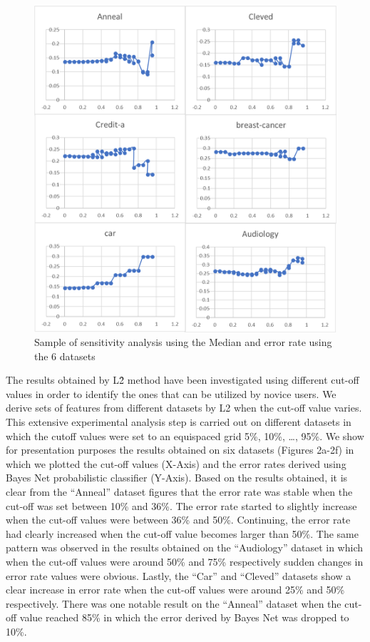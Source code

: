 \documentclass[review]{elsarticle}
\begin{document}
\begin{figure}[h]
	\centering
	\includegraphics[width=1\linewidth]{figs/results}
	\caption[Figs 2a-2f]{Sample of sensitivity analysis using the Median and error rate using the 6 datasets}
	\label{fig:2a2f}
\end{figure}

The results obtained by L\^2 method have been investigated using different cut-off values in order to identify the ones that can be utilized by novice users. We derive sets of features from different datasets by L2 when the cut-off value varies. This extensive experimental analysis step is carried out on different datasets in which the cutoff values were set to an equispaced grid {5\%, 10\%, …, 95\%}. We show for presentation purposes the results obtained on six datasets (Figures 2a-2f) in which we plotted the cut-off values (X-Axis) and the error rates derived using Bayes Net probabilistic classifier (Y-Axis). Based on the results obtained, it is clear from the “Anneal” dataset figures that the error rate was stable when the cut-off was set between 10\% and 36\%. The error rate started to slightly increase when the cut-off values were between 36\% and 50\%. Continuing, the error rate had clearly increased when the cut-off value becomes larger than 50\%. The same pattern was observed in the results obtained on the “Audiology” dataset in which when the cut-off values were around 50\% and 75\% respectively sudden changes in error rate values were obvious. Lastly, the “Car” and “Cleved” datasets show a clear increase in error rate when the cut-off values were around 25\% and 50\% respectively. There was one notable result on the “Anneal” dataset when the cut-off value reached 85\% in which  the error derived by Bayes Net was dropped to 10\%. 
\end{document}
